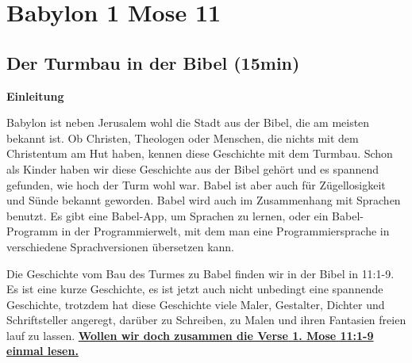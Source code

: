 \documentclass[14pt]{../../inc/mybib}
\author{Lothar Schmid}
\newenvironment{block}[1][]{%
  \vspace{1.5em}%
  \noindent\textbf{#1}\par%
  \vspace{0.0em}%
}{%
  \vspace{1em}%
}
\begin{document}
\setlength{\baselineskip}{1.5\baselineskip}
\section{Babylon 1 Mose 11}

\subsection{Der Turmbau in der Bibel (15min)}
    \begin{block}[Einleitung]
    Babylon ist neben Jerusalem wohl die Stadt aus der Bibel, die am meisten bekannt ist. Ob Christen, Theologen oder Menschen, die nichts mit dem Christentum am Hut haben, kennen diese Geschichte mit dem Turmbau. Schon als Kinder haben wir diese Geschichte aus der Bibel gehört und es spannend gefunden, wie hoch der Turm wohl war. Babel ist aber auch für Zügellosigkeit und Sünde bekannt geworden. Babel wird auch im Zusammenhang mit Sprachen benutzt. Es gibt eine Babel-App, um Sprachen zu lernen, oder ein Babel-Programm in der Programmierwelt, mit dem man eine Programmiersprache in verschiedene Sprachversionen übersetzen kann.
    \end{block}
    \begin{block}
    Die Geschichte vom Bau des Turmes zu Babel finden wir in der Bibel in  {11:1-9}. Es ist eine kurze Geschichte, es ist jetzt auch nicht unbedingt eine spannende Geschichte, trotzdem hat diese Geschichte viele Maler, Gestalter, Dichter und Schriftsteller angeregt, darüber zu Schreiben, zu Malen und ihren Fantasien freien lauf zu lassen. 
    \end{block}
    \underline{\textbf{Wollen wir doch zusammen die Verse 1. Mose 11:1-9 einmal lesen.}}
    \vspace{1em}
\end{document}
